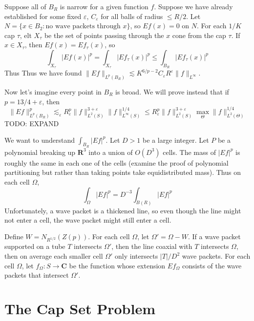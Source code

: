 Suppose all of $B_R$ is narrow for a given function $f$. Suppose we have already established for some fixed $\varepsilon$, $C_\varepsilon$ for all balls of radius $\leq R/2$. Let $N = \{ x \in B_2: \text{no wave packets through $x$} \}$, so $Ef(x) = 0$ on $N$. For each $1/K$ cap $\tau$, elt $X_\tau$ be the set of points passing through the $x$ cone from the cap $\tau$. If $x \in X_\tau$, then $Ef(x) = Ef_\tau(x)$, so
%
\[ \int_{X_\tau} |Ef(x)|^p = \int_{X_\tau} |Ef_\tau(x)|^p \leq \int_{B_R} |Ef_\tau(x)|^p \]
%
Thus
%
%
Thus we have found $\| E f\|_{L^p(B_R)} \lesssim K^{6/p - 2} C_\varepsilon R^\varepsilon \| f \|_{L^\infty}$.

Now let's imagine every point in $B_R$ is broad. We will prove instead that if $p = 13/4 + \varepsilon$, then
%
\[ \| Ef \|_{L^p(B_R)}^p \lesssim_\varepsilon R_\varepsilon^p \| f \|_{L^2(S)}^{3 + \varepsilon} \| f \|_{L^\infty(S)}^{1/4} \leq R_\varepsilon^p \| f \|_{L^2(S)}^{3 + \varepsilon} \max_\Theta \| f \|_{L^2(\Theta)}^{1/4} \]
%
TODO: EXPAND

We want to understand $\int_{B_R} |Ef|^p$. Let $D > 1$ be a large integer. Let $P$ be a polynomial breaking up $\mathbf{R}^3$ into a union of $O(D^3)$ cells. The mass of $|Ef|^p$ is roughly the same in each one of the cells (examine the proof of polynomial partitioning but rather than taking points take equidistributed mass). Thus on each cell $\Omega$,
%
\[ \int_\Omega |Ef|^p = D^{-3} \int_{B(R)} |Ef|^p \]
%
Unfortunately, a wave packet is a thickened line, so even though the line might not enter a cell, the wave packet might still enter a cell.

Define $W = N_{R^{1/2}}(Z(p))$. For each cell $\Omega$, let $\Omega' = \Omega - W$. If a wave packet supported on a tube $T$ intersects $\Omega'$, then the line coaxial with $T$ intersects $\Omega$, then on average each smaller cell $\Omega'$ only intersects $|T|/D^2$ wave packets. For each cell $\Omega$, let $f_\Omega: S \to \mathbf{C}$ be the function whose extension $Ef_\Omega$ consists of the wave packets that intersect $\Omega'$.

\chapter{The Cap Set Problem}

